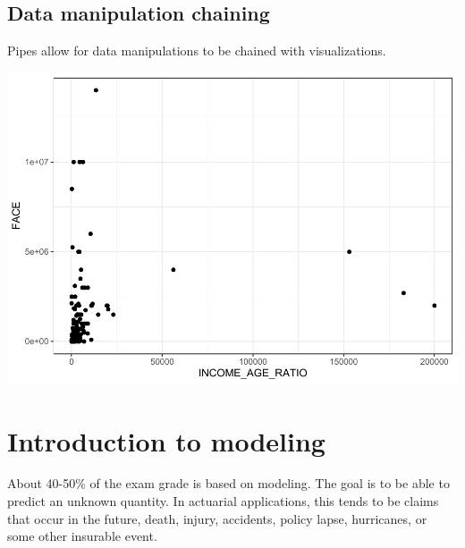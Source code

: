 \documentclass[
  openany]{book}
\newenvironment{Shaded}{\begin{snugshade}}{\end{snugshade}}
\newcommand{\DataTypeTok}[1]{\textcolor[rgb]{0.13,0.29,0.53}{#1}}
\newcommand{\DecValTok}[1]{\textcolor[rgb]{0.00,0.00,0.81}{#1}}
\newcommand{\KeywordTok}[1]{\textcolor[rgb]{0.13,0.29,0.53}{\textbf{#1}}}
\newcommand{\NormalTok}[1]{#1}
\newcommand{\OperatorTok}[1]{\textcolor[rgb]{0.81,0.36,0.00}{\textbf{#1}}}
\newcommand{\StringTok}[1]{\textcolor[rgb]{0.31,0.60,0.02}{#1}}
\begin{document}
\hypertarget{data-manipulation-chaining}{%
\section{Data manipulation chaining}\label{data-manipulation-chaining}}

Pipes allow for data manipulations to be chained with visualizations.

\begin{Shaded}
\end{Shaded}

\includegraphics{04-visualization_files/figure-latex/unnamed-chunk-7-1.pdf}

\hypertarget{introduction-to-modeling}{%
\chapter{Introduction to modeling}\label{introduction-to-modeling}}

About 40-50\% of the exam grade is based on modeling. The goal is to be able to predict an unknown quantity. In actuarial applications, this tends to be claims that occur in the future, death, injury, accidents, policy lapse, hurricanes, or some other insurable event.
\end{document}
